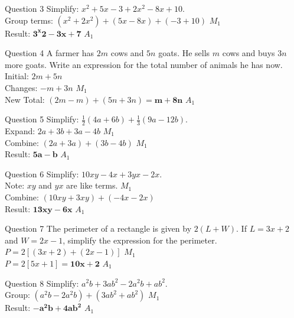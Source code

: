 \documentclass[12pt, a4paper, oneside]{article}
\begin{document}
\begin{solvingbox}{Question 3}
Simplify: $x^2 + 5x - 3 + 2x^2 - 8x + 10$. \\
Group terms: $(x^2 + 2x^2) + (5x - 8x) + (-3 + 10)$ \hfill $M_1$ \\
Result: $\mathbf{3^x2 - 3x + 7}$ \hfill $A_1$
\end{solvingbox}

\begin{solvingbox}{Question 4}
A farmer has $2m$ cows and $5n$ goats. He sells $m$ cows and buys $3n$ more goats. Write an expression for the total number of animals he has now. \\
Initial: $2m + 5n$ \\
Changes: $-m + 3n$ \hfill $M_1$ \\
New Total: $(2m - m) + (5n + 3n) = \mathbf{m + 8n}$ \hfill $A_1$
\end{solvingbox}

\begin{solvingbox}{Question 5}
Simplify: $\frac{1}{2}(4a + 6b) + \frac{1}{3}(9a - 12b)$. \\
Expand: $2a + 3b + 3a - 4b$ \hfill $M_1$ \\
Combine: $(2a + 3a) + (3b - 4b)$ \hfill $M_1$ \\
Result: $\mathbf{5a - b}$ \hfill $A_1$
\end{solvingbox}

\begin{solvingbox}{Question 6}
Simplify: $10xy - 4x + 3yx - 2x$. \\
Note: $xy$ and $yx$ are like terms. \hfill $M_1$ \\
Combine: $(10xy + 3xy) + (-4x - 2x)$ \\
Result: $\mathbf{13xy - 6x}$ \hfill $A_1$
\end{solvingbox}

\begin{solvingbox}{Question 7}
The perimeter of a rectangle is given by $2(L + W)$. If $L = 3x + 2$ and $W = 2x - 1$, simplify the expression for the perimeter. \\
$P = 2[(3x + 2) + (2x - 1)]$ \hfill $M_1$ \\
$P = 2[5x + 1] = \mathbf{10x + 2}$ \hfill $A_1$
\end{solvingbox}

\begin{solvingbox}{Question 8}
Simplify: $a^2b + 3ab^2 - 2a^2b + ab^2$. \\
Group: $(a^2b - 2a^2b) + (3ab^2 + ab^2)$ \hfill $M_1$ \\
Result: $\mathbf{-a^2b + 4ab^2}$ \hfill $A_1$
\end{solvingbox}
\end{document}
